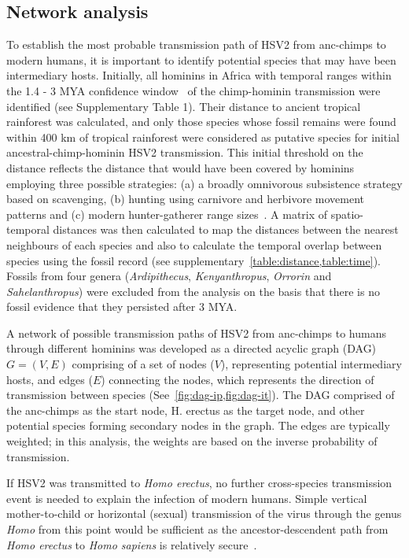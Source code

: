 \documentclass[fleqn,10pt]{wlscirep}
\begin{document}
\subsection*{Network analysis}
To establish the most probable transmission path of HSV2 from anc-chimps to modern humans, it is important to identify potential species that may have been intermediary hosts. Initially, all hominins in Africa with temporal ranges within the 1.4 - 3 MYA confidence window~\citep{Wertheim2014} of the chimp-hominin transmission were identified (see Supplementary Table 1). Their distance to ancient tropical rainforest was calculated, and only those species whose fossil remains were found within 400 km of tropical rainforest were considered as putative species for initial ancestral-chimp-hominin HSV2 transmission. This initial threshold on the distance reflects the distance that would have been covered by hominins employing three possible strategies: (a) a broadly omnivorous subsistence strategy based on scavenging, (b) hunting using carnivore and herbivore movement patterns and (c) modern hunter-gatherer range sizes~\citep{Foley1978,Grant1992}. A matrix of spatio-temporal distances was then calculated to map the distances between the nearest neighbours of each species and also to calculate the temporal overlap between species using the fossil record (see supplementary~\cref{table:distance,table:time}). Fossils from four genera (\textit{Ardipithecus}, \textit{Kenyanthropus}, \textit{Orrorin} and \textit{Sahelanthropus}) were excluded from the analysis on the basis that there is no fossil evidence that they persisted after 3 MYA.

A  network of possible transmission paths of HSV2 from anc-chimps to humans through different hominins was developed as a directed acyclic graph (DAG) $G = (V, E)$ comprising of a set of nodes ($V$), representing potential intermediary hosts, and edges ($E$) connecting the nodes, which represents the direction of transmission between species (See~\cref{fig:dag-ip,fig:dag-it}). The DAG comprised of the anc-chimps as the start node, H. erectus as the target node, and other potential species forming secondary nodes in the graph. The edges are typically weighted; in this analysis, the weights are based on the inverse probability of transmission.

If HSV2 was transmitted to \textit{Homo erectus}, no further cross-species transmission event is needed to explain the infection of modern humans. Simple vertical mother-to-child or horizontal (sexual) transmission of the virus through the genus \textit{Homo} from this point would be sufficient as the ancestor-descendent path from \textit{Homo erectus} to \textit{Homo sapiens} is relatively secure~\citep{Maslin2015}.
\end{document}
